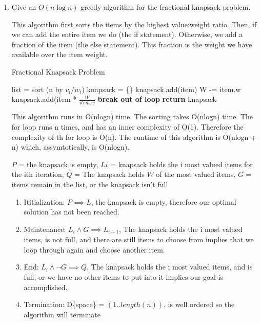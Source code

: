 \documentclass{article}
\begin{document}
\begin{enumerate}
    \item Give an $O(n\log n)$ greedy algorithm for the fractional knapsack problem.
      
This algorithm first sorts the items by the highest value:weight ratio. Then, if we can add the entire item we do (the if statement). Otherwise, we add a fraction of the item (the else statement). This fraction is the weight we have available over the item weight. 

\begin{algorithm}
    \caption{Fractional Knapsack Problem}\label{fracKnap}
    \begin{algorithmic}[1]
      \State list = sort (n by $v_i/w_i$)
      \State knapsack = \{\}
      		\State knapsack.add(item)
      		\State W -= item.w
      	\Else
      		\State knapsack.add(item * $\frac{W}{item.w}$
      		\State \textbf{break out of loop}
      	\EndIf
      \EndFor
      \State \textbf{return} knapsack
    \EndFunction
    \end{algorithmic}
\end{algorithm} 

This algorithm runs in O(nlogn) time. The sorting takes O(nlogn) time. The for loop runs n times, and has an inner complexity of O(1). Therefore the complexity of th for loop is O(n). The runtime of this algorithm is O(nlogn + n) which, assymtotically, is O(nlogn).

$P$ = the knapsack is empty, $Li$ = knapsack holds the i most valued items for the ith iteration, $Q$ = The knapsack holds $W$ of the most valued items, $G$ = items remain in the list, or the knapsack isn't full
    \begin{enumerate}
        \item Ititialization: $P \implies L$, the knapsack is empty, therefore our optimal solution has not been reached.
        \item Maintenance: $L_{i} \land G \implies L_{i+1}$, The knapsack holds the i most valued items, is not full, and there are still items to choose from implies that we loop through again and choose another item.
        \item End: $L_{i} \land \neg G \implies Q$, The knapsack holds the i most valued items, and is full, or we have no other items to put into it implies our goal is accomplished.
        \item Termination: D\{space\} = $(1..length(n))$, is well ordered so the algorithm will terminate
    \end{enumerate}
    

\end{enumerate}
\end{document}
